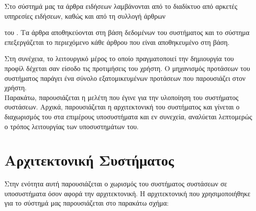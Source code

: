 Στο σύστημά μας τα άρθρα ειδήσεων λαμβάνονται από το διαδίκτυο από αρκετές υπηρεσίες ειδήσεων, 
καθώς και από τη συλλογή άρθρων {\textit {{}} του {}. 
Τα άρθρα αποθηκεύονται στη βάση δεδομένων του συστήματος και 
το σύστημα επεξεργάζεται το περιεχόμενο κάθε άρθρου που είναι αποθηκευμένο στη βάση. 


Στη συνέχεια, το λειτουργικό μέρος το οποίο πραγματοποιεί την δημιουργία του προφίλ δέχεται σαν είσοδο τις
προτιμήσεις του χρήστη. 
Ο μηχανισμός προτάσεων του συστήματος παράγει ένα σύνολο εξατομικευμένων προτάσεων που
παρουσιάζει στον χρήστη.
\\

Παρακάτω, παρουσιάζεται η μελέτη που έγινε για την υλοποίηση του συστήματος συστάσεων. 
Αρχικά, παρουσιάζεται η αρχιτεκτονική του συστήματος και γίνεται ο διαχωρισμός του στα επιμέρους υποσυστήματα 
και εν συνεχεία, αναλύεται λεπτομερώς ο τρόπος λειτουργίας των υποσυστημάτων του.

\section{Αρχιτεκτονική Συστήματος}

Στην ενότητα αυτή παρουσιάζεται ο χωρισμός του συστήματος συστάσεων σε υποσυστήματα όσον αφορά την αρχιτεκτονική.
\newpage
Η αρχιτεκτονική που χρησιμοποιήθηκε για το σύστημά μας παρουσιάζεται στο παρακάτω σχήμα:

}
